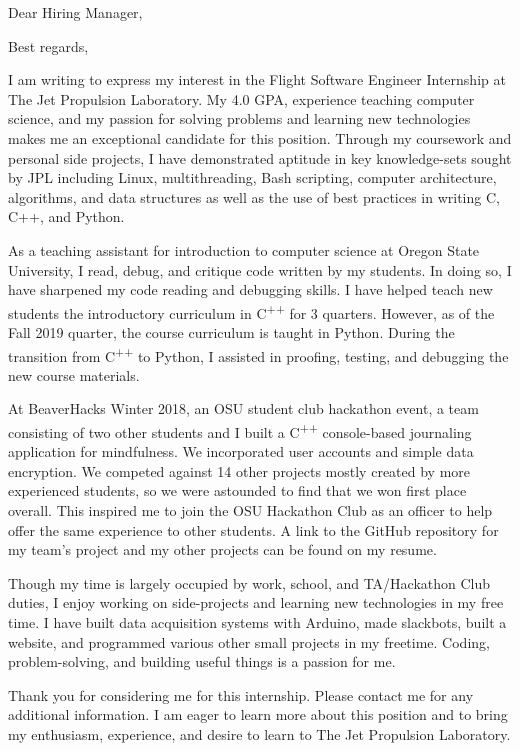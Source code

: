 \documentclass[11pt,a4paper,roman]{moderncv}        %
\begin{document}
\date{November 8, 2019}
\opening{Dear Hiring Manager,}
\closing{Best regards,}
\makelettertitle

I am writing to express my interest in the Flight Software Engineer Internship at The Jet Propulsion Laboratory. My 4.0 GPA, experience teaching computer science, and my passion for solving problems and learning new technologies makes me an exceptional candidate for this position. Through my coursework and personal side projects, I have demonstrated aptitude in key knowledge-sets sought by JPL including Linux, multithreading, Bash scripting, computer architecture, algorithms, and data structures as well as the use of best practices in writing C, C++, and Python. 
 
As a teaching assistant for introduction to computer science at Oregon State University, I read, debug, and critique code written by my students. In doing so, I have sharpened my code reading and debugging skills. I have helped teach new students the introductory curriculum in C\textsuperscript{++} for 3 quarters. However, as of the Fall 2019 quarter, the course curriculum is taught in Python. During the transition from C\textsuperscript{++} to Python, I assisted in proofing, testing, and debugging the new course materials.
 
At BeaverHacks Winter 2018, an OSU student club hackathon event, a team consisting of two other students and I built a C\textsuperscript{++} console-based journaling application for mindfulness. We incorporated user accounts and simple data encryption. We competed against 14 other projects mostly created by more experienced students, so we were astounded to find that we won first place overall. This inspired me to join the OSU Hackathon Club as an officer to help offer the same experience to other students. A link to the GitHub repository for my team's project and my other projects can be found on my resume.

Though my time is largely occupied by work, school, and TA/Hackathon Club duties, I enjoy working on side-projects and learning new technologies in my free time. I have built data acquisition systems with Arduino, made slackbots, built a website, and programmed various other small projects in my freetime. Coding, problem-solving, and building useful things is a passion for me.

Thank you for considering me for this internship. Please contact me for any additional information. I am eager to learn more about this position and to bring my enthusiasm, experience, and desire to learn to The Jet Propulsion Laboratory. 



\makeletterclosing
\end{document}
